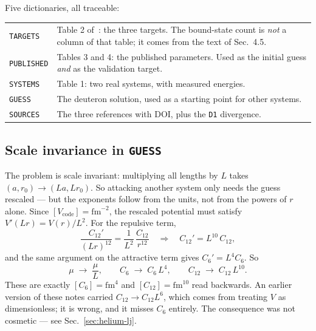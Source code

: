 \documentclass[11pt,a4paper]{article}
\begin{document}
Five dictionaries, all traceable:

\begin{center}
\begin{tabular}{lp{10cm}}
\toprule
\texttt{TARGETS} & Table 2 of~\cite{rbef}: the three targets. The bound-state count is \emph{not} a column of that table; it comes from the text of Sec.~4.5. \\
\texttt{PUBLISHED} & Tables 3 and 4: the published parameters. Used as the initial guess \emph{and} as the validation target. \\
\texttt{SYSTEMS} & Table 1: two real systems, with measured energies. \\
\texttt{GUESS} & The deuteron solution, used as a starting point for other systems. \\
\texttt{SOURCES} & The three references with DOI, plus the \texttt{D1} divergence. \\
\bottomrule
\end{tabular}
\end{center}

\subsection{Scale invariance in \texttt{GUESS}}
\label{sec:scale}

The problem is scale invariant: multiplying all lengths by $L$ takes
$(a, r_0)\to(La, Lr_0)$. So attacking another system only needs the guess
rescaled --- but the exponents follow from the units, not from the powers of
$r$ alone. Since $[V_{\mathrm{code}}] = \mathrm{fm}^{-2}$, the rescaled
potential must satisfy $V'(Lr) = V(r)/L^2$. For the repulsive term,
\begin{equation*}
  \frac{C_{12}'}{(Lr)^{12}} = \frac{1}{L^2}\,\frac{C_{12}}{r^{12}}
  \quad\Longrightarrow\quad C_{12}' = L^{10}\,C_{12},
\end{equation*}
and the same argument on the attractive term gives $C_6' = L^4 C_6$. So
\begin{equation}
  \mu \;\to\; \frac{\mu}{L}, \qquad
  C_6 \;\to\; C_6\,L^{4}, \qquad
  C_{12} \;\to\; C_{12}\,L^{10}.
\end{equation}
These are exactly $[C_6] = \mathrm{fm}^4$ and $[C_{12}] = \mathrm{fm}^{10}$ read
backwards. An earlier version of these notes carried $C_{12} \to C_{12}L^6$,
which comes from treating $V$ as dimensionless; it is wrong, and it misses
$C_6$ entirely. The consequence was not cosmetic --- see
Sec.~\ref{sec:helium-lj}.
\end{document}
